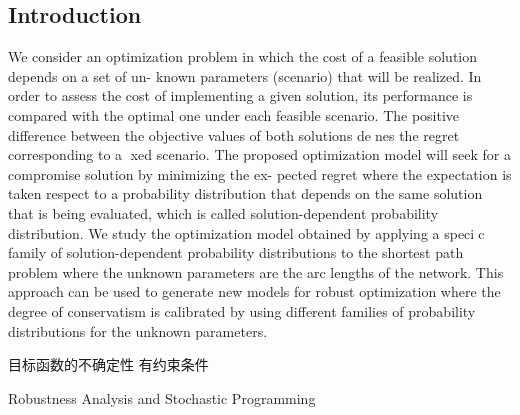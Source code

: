 \documentclass[
10pt, %
a4paper, %
onecolumn, %
portrait %
]{article}
\begin{document}
\begin{CJK*}{UTF8}{gbsn}
\pagestyle{myheadings} %
\markright{\doctitle} %


\thispagestyle{plain} %

\printtitle %


\section*{Introduction} %

We consider an optimization problem in which the cost of a feasible solution depends on a set of un-
 known parameters (scenario) that will be realized. In order to assess the cost of implementing a given
 solution, its performance is compared with the optimal one under each feasible scenario. The positive
 difference between the objective values of both solutions denes the regret corresponding to a   xed
 scenario. The proposed optimization model will seek for a compromise solution by minimizing the ex-
 pected regret where the expectation is taken respect to a probability distribution that depends on the
 same solution that is being evaluated, which is called solution-dependent probability distribution. We
 study the optimization model obtained by applying a specic family of solution-dependent probability
 distributions to the shortest path problem where the unknown parameters are the arc lengths of the
 network. This approach can be used to generate new models for robust optimization where the degree of
 conservatism   is   calibrated   by   using   different   families   of   probability   distributions   for   the   unknown
 parameters.

目标函数的不确定性
有约束条件

 Robustness Analysis
 and   Stochastic   Programming




\renewcommand{\refname}{Reference} %


\end{CJK*}
\end{document}
